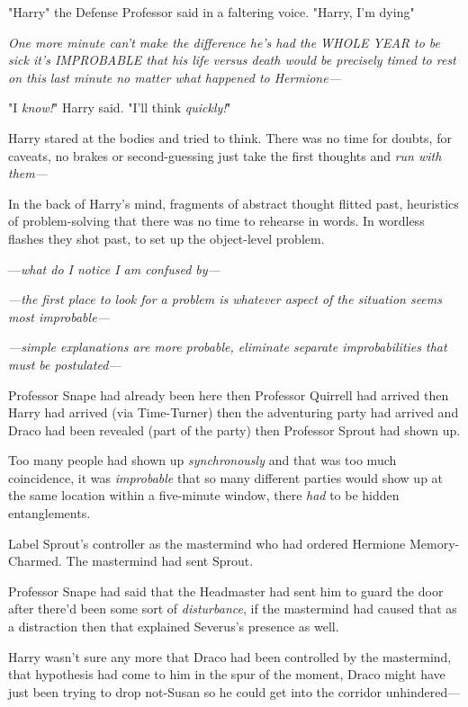 "Harry{\el}" the Defense Professor said in a faltering voice. "Harry, I'm
dying{\el}"

\emph{One more minute can't make the difference he's had the WHOLE YEAR to be
sick it's IMPROBABLE that his life versus death would be precisely timed to
rest on this last minute no matter what happened to Hermione---}

"I \emph{know!}" Harry said. "I'll think \emph{quickly!}"

Harry stared at the bodies and tried to think. There was no time for doubts,
for caveats, no brakes or second-guessing just take the first thoughts and
\emph{run with them---}

In the back of Harry's mind, fragments of abstract thought flitted past,
heuristics of problem-solving that there was no time to rehearse in words. In
wordless flashes they shot past, to set up the object-level problem.

---\emph{what do I notice I am confused by---}

\emph{---the first place to look for a problem is whatever aspect of the
situation seems most improbable---}

\emph{---simple explanations are more probable, eliminate separate
improbabilities that must be postulated---}

Professor Snape had already been here then Professor Quirrell had arrived then
Harry had arrived (via Time-Turner) then the adventuring party had arrived and
Draco had been revealed (part of the party) then Professor Sprout had shown up.

Too many people had shown up \emph{synchronously} and that was too much
coincidence, it was \emph{improbable} that so many different parties would show
up at the same location within a five-minute window, there \emph{had} to be
hidden entanglements.

Label Sprout's controller as the mastermind who had ordered Hermione
Memory-Charmed. The mastermind had sent Sprout.

Professor Snape had said that the Headmaster had sent him to guard the door
after there'd been some sort of \emph{disturbance}, if the mastermind had
caused that as a distraction then that explained Severus's presence as well.

Harry wasn't sure any more that Draco had been controlled by the mastermind,
that hypothesis had come to him in the spur of the moment, Draco might have
just been trying to drop not-Susan so he could get into the corridor unhindered---

